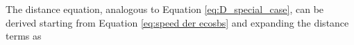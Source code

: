 \documentclass{article}
\begin{document}
The distance equation, analogous to Equation \eqref{eq:D_special_case}, can be derived starting from Equation \eqref{eq:speed der ecosbs} and expanding the distance terms as
\end{document}
